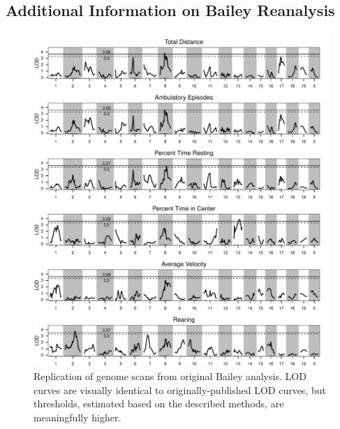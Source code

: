     \subsection{Additional Information on Bailey Reanalysis}
        \begin{figure}[h!]
            \includegraphics[width=\textwidth]{images/bailey_replication_scanones.pdf}
            \caption{Replication of genome scans from original Bailey analysis. LOD curves are visually identical to originally-published LOD curves, but thresholds, estimated based on the described methods, are meaningfully higher.}
            \label{fig:Bailey_replicate}
        \end{figure}

